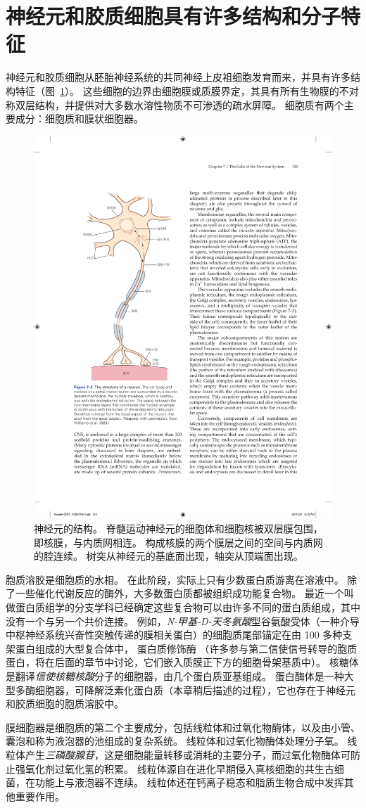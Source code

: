 \section{神经元和胶质细胞具有许多结构和分子特征}

神经元和胶质细胞从胚胎神经系统的共同神经上皮祖细胞发育而来，并具有许多结构特征（图~\ref{fig:7_2}）。
这些细胞的边界由细胞膜或质膜界定，其具有所有生物膜的不对称双层结构，并提供对大多数水溶性物质不可渗透的疏水屏障。
细胞质有两个主要成分：细胞质和膜状细胞器。


\begin{figure}[htbp]
	\centering
	\includegraphics[width=0.5\linewidth]{chap07/fig_7_2}
	\caption{神经元的结构。
		脊髓运动神经元的细胞体和细胞核被双层膜包围，即核膜，与内质网相连。
		构成核膜的两个膜层之间的空间与内质网的腔连续。
		树突从神经元的基底面出现，轴突从顶端面出现\cite{williams1989bannister}。}
	\label{fig:7_2}
\end{figure}


胞质溶胶是细胞质的水相。
在此阶段，实际上只有少数蛋白质游离在溶液中。
除了一些催化代谢反应的酶外，大多数蛋白质都被组织成功能复合物。
最近一个叫做蛋白质组学的分支学科已经确定这些复合物可以由许多不同的蛋白质组成，其中没有一个与另一个共价连接。
例如，\textit{N-甲基-D-天冬氨酸}型谷氨酸受体（一种介导中枢神经系统兴奋性突触传递的膜相关蛋白）的细胞质尾部锚定在由 100 多种支架蛋白组成的大型复合体中， 蛋白质修饰酶
（许多参与第二信使信号转导的胞质蛋白，将在后面的章节中讨论，它们嵌入质膜正下方的细胞骨架基质中）。
核糖体是翻译\textit{信使核糖核酸}分子的细胞器，由几个蛋白质亚基组成。
蛋白酶体是一种大型多酶细胞器，可降解泛素化蛋白质（本章稍后描述的过程），它也存在于神经元和胶质细胞的胞质溶胶中。


膜细胞器是细胞质的第二个主要成分，包括线粒体和过氧化物酶体，以及由小管、囊泡和称为液泡器的池组成的复杂系统。
线粒体和过氧化物酶体处理分子氧。
线粒体产生\textit{三磷酸腺苷}，这是细胞能量转移或消耗的主要分子，而过氧化物酶体可防止强氧化剂过氧化氢的积累。
线粒体源自在进化早期侵入真核细胞的共生古细菌，在功能上与液泡器不连续。
线粒体还在钙离子稳态和脂质生物合成中发挥其他重要作用。


